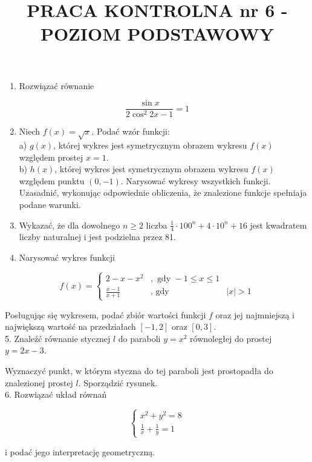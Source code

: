 \documentclass[10pt]{article}
\title{PRACA KONTROLNA nr 6 - POZIOM PODSTAWOWY }
\author{}
\date{}
\begin{document}
\maketitle
\begin{enumerate}
  \item Rozwiązać równanie
\end{enumerate}

$$
\frac{\sin x}{2 \cos ^{2} 2 x-1}=1
$$

\begin{enumerate}
  \setcounter{enumi}{1}
  \item Niech $f(x)=\sqrt{x}$. Podać wzór funkcji:\\
a) $g(x)$, której wykres jest symetrycznym obrazem wykresu $f(x)$ względem prostej $x=1$.\\
b) $h(x)$, której wykres jest symetrycznym obrazem wykresu $f(x)$ względem punktu $(0,-1)$. Narysować wykresy wszystkich funkcji. Uzasadnić, wykonując odpowiednie obliczenia, że znalezione funkcje spełniaja podane warunki.
  \item Wykazać, że dla dowolnego $n \geqslant 2$ liczba $\frac{1}{4} \cdot 100^{n}+4 \cdot 10^{n}+16$ jest kwadratem liczby naturalnej i jest podzielna przez 81.
  \item Narysować wykres funkcji
\end{enumerate}

$$
f(x)=\left\{\begin{array}{lll}
2-x-x^{2} & , \text { gdy }-1 \leqslant x \leqslant 1 \\
\frac{x-1}{x+1} & , \text { gdy } & |x|>1
\end{array}\right.
$$

Posługując się wykresem, podać zbiór wartości funkcji $f$ oraz jej najmniejszą i największą wartość na przedziałach $[-1,2]$ oraz $[0,3]$.\\
5. Znaleźć równanie stycznej $l$ do paraboli $y=x^{2}$ równoległej do prostej $y=2 x-3$.

Wyznaczyć punkt, w którym styczna do tej paraboli jest prostopadła do znalezionej prostej $l$. Sporządzić rysunek.\\
6. Rozwiązać układ równań

$$
\left\{\begin{array}{l}
x^{2}+y^{2}=8 \\
\frac{1}{x}+\frac{1}{y}=1
\end{array}\right.
$$

i podać jego interpretację geometryczną.
\end{document}
